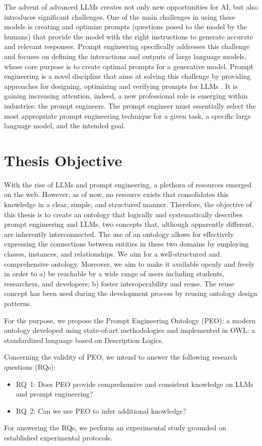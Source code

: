 The advent of advanced LLMs creates not only new opportunities for AI, but also introduces significant challenges.
One of the main challenges in using these models is creating and optimize prompts (questions posed to the model by the humans) \cite{ref5} that provide the model with the right instructions to generate accurate and relevant responses. Prompt engineering specifically addresses this challenge and focuses on defining the interactions and outputs of large language models, whose core purpose is to create optimal prompts for a generative model\cite{amatriain2024prompt}.
Prompt engineering is a novel discipline that aims at solving this challenge by providing approaches for designing, optimizing and verifying prompts for LLMs \cite{amatriain2024prompt}.
It is gaining increasing attention, indeed, a new professional role is emerging within industries: the prompt engineers. The prompt engineer must essentially select the most appropriate prompt engineering technique for a given task, a specific large language model, and the intended goal.

\section{Thesis Objective}
With the rise of LLMs and prompt engineering, a plethora of resources emerged on the web.
However, as of now, no resource exists that consolidates this knowledge in a clear, simple, and structured manner.
Therefore, the objective of this thesis is to create 
an ontology that logically and systematically describes prompt engineering and LLMs, two concepts that, although apparently different, are inherently interconnected.
The use of an ontology allows for effectively expressing the connections between entities in these two domains by employing classes, instances, and relationships.
We aim for a well-structured and comprehensive ontology.
Moreover, we aim to make it available openly and freely in order to a) be reachable by a wide range of users including students, researchers, and developers; b) foster interoperability and reuse. The reuse concept has been used during the development process by reusing ontology design patterns. 

For the purpose, we propose the Prompt Engineering Ontology (PEO): a modern ontology developed using state-of-art methodologies and implemented in OWL: a standardized language based on Description Logics.

Concerning the validity of PEO, we intend to answer the following research questions (RQs):
\begin{itemize}
    \item RQ~1: Does PEO provide comprehensive and consistent knowledge on LLMs and prompt engineering?

    \item RQ~2: Can we use PEO to infer additional knowledge?
\end{itemize}
For answering the RQs, we perform an experimental study grounded on established experimental protocols.


